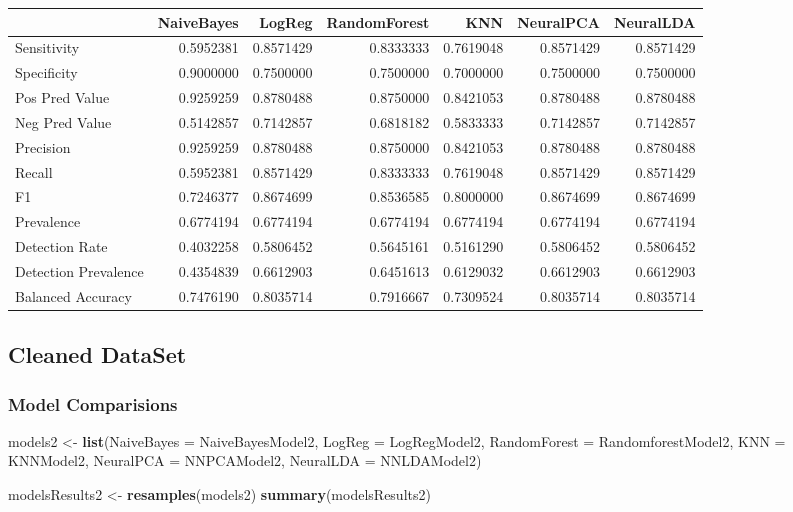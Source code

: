 \documentclass[
]{article}
\newenvironment{Shaded}{\begin{snugshade}}{\end{snugshade}}
\newcommand{\DataTypeTok}[1]{\textcolor[rgb]{0.13,0.29,0.53}{#1}}
\newcommand{\KeywordTok}[1]{\textcolor[rgb]{0.13,0.29,0.53}{\textbf{#1}}}
\newcommand{\NormalTok}[1]{#1}
\newcommand{\StringTok}[1]{\textcolor[rgb]{0.31,0.60,0.02}{#1}}
\begin{document}
\begin{tabular}{l|r|r|r|r|r|r}
\hline
  & NaiveBayes & LogReg & RandomForest & KNN & NeuralPCA & NeuralLDA\\
\hline
Sensitivity & 0.5952381 & 0.8571429 & 0.8333333 & 0.7619048 & 0.8571429 & 0.8571429\\
\hline
Specificity & 0.9000000 & 0.7500000 & 0.7500000 & 0.7000000 & 0.7500000 & 0.7500000\\
\hline
Pos Pred Value & 0.9259259 & 0.8780488 & 0.8750000 & 0.8421053 & 0.8780488 & 0.8780488\\
\hline
Neg Pred Value & 0.5142857 & 0.7142857 & 0.6818182 & 0.5833333 & 0.7142857 & 0.7142857\\
\hline
Precision & 0.9259259 & 0.8780488 & 0.8750000 & 0.8421053 & 0.8780488 & 0.8780488\\
\hline
Recall & 0.5952381 & 0.8571429 & 0.8333333 & 0.7619048 & 0.8571429 & 0.8571429\\
\hline
F1 & 0.7246377 & 0.8674699 & 0.8536585 & 0.8000000 & 0.8674699 & 0.8674699\\
\hline
Prevalence & 0.6774194 & 0.6774194 & 0.6774194 & 0.6774194 & 0.6774194 & 0.6774194\\
\hline
Detection Rate & 0.4032258 & 0.5806452 & 0.5645161 & 0.5161290 & 0.5806452 & 0.5806452\\
\hline
Detection Prevalence & 0.4354839 & 0.6612903 & 0.6451613 & 0.6129032 & 0.6612903 & 0.6612903\\
\hline
Balanced Accuracy & 0.7476190 & 0.8035714 & 0.7916667 & 0.7309524 & 0.8035714 & 0.8035714\\
\hline
\end{tabular}

\hypertarget{cleaned-dataset-7}{%
\subsection{Cleaned DataSet}\label{cleaned-dataset-7}}

\hypertarget{model-comparisions-1}{%
\subsubsection{Model Comparisions}\label{model-comparisions-1}}

\begin{Shaded}
\begin{Highlighting}[]
\NormalTok{models2 <-}\StringTok{ }\KeywordTok{list}\NormalTok{(}\DataTypeTok{NaiveBayes =}\NormalTok{ NaiveBayesModel2, }
                    \DataTypeTok{LogReg =}\NormalTok{ LogRegModel2,}
                    \DataTypeTok{RandomForest =}\NormalTok{ RandomforestModel2,}
                    \DataTypeTok{KNN =}\NormalTok{ KNNModel2,}
                    \DataTypeTok{NeuralPCA =}\NormalTok{ NNPCAModel2,}
                    \DataTypeTok{NeuralLDA =}\NormalTok{ NNLDAModel2)   }

\NormalTok{modelsResults2 <-}\StringTok{ }\KeywordTok{resamples}\NormalTok{(models2)}
\KeywordTok{summary}\NormalTok{(modelsResults2)}
\end{Highlighting}
\end{Shaded}
\end{document}
